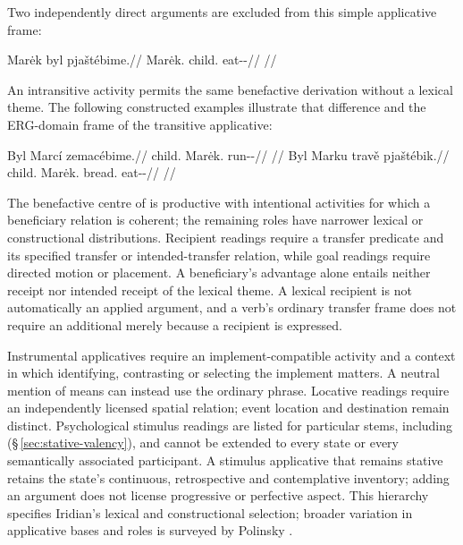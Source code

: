 Two independently direct arguments are excluded from this simple applicative
frame:

\ex
\begingl
\gla *Marėk byl pjaštébime.//
\glb Marėk.\Dir{} child.\Dir{} eat-\Appl{}-\Prog{}//
\glft {}//
\endgl
\xe

An intransitive activity permits the same benefactive derivation without a
lexical theme. The following constructed examples illustrate that difference
and the ERG-domain frame of the transitive applicative:

\pex\label{ex:val-appl-ergative}
\a
\begingl
\gla Byl Marcí zemacébime.//
\glb child.\Dir{} Marėk.\Ind{} run-\Appl{}-\Prog{}//
\glft {}//
\endgl
\a
\begingl
\gla Byl Marku travě pjaštébik.//
\glb child.\Dir{} Marėk.\Trs{} bread.\Ind{} eat-\Appl{}-\Pf{}//
\glft {}//
\endgl
\xe

The benefactive centre of  is productive with intentional
activities for which a beneficiary relation is coherent; the remaining roles
have narrower lexical or constructional distributions. Recipient readings
require a transfer predicate and its specified transfer or intended-transfer
relation, while goal readings require directed motion or placement. A
beneficiary's advantage alone entails neither receipt nor intended receipt of
the lexical theme. A lexical recipient is not automatically an applied
argument, and a verb's ordinary transfer frame does not require an additional
 merely because a recipient is expressed.

Instrumental applicatives require an implement-compatible activity and a
context in which identifying, contrasting or selecting the implement matters.
A neutral mention of means can instead use the ordinary  phrase.
Locative readings require an independently licensed spatial relation; event
location and destination remain distinct. Psychological stimulus readings are
listed for particular stems, including 
(§\,\ref{sec:stative-valency}), and cannot be extended to every state or
every semantically associated participant. A stimulus applicative that
remains stative retains the state's continuous, retrospective and
contemplative inventory; adding an argument does not license progressive
or perfective aspect. This hierarchy specifies Iridian's
lexical and constructional selection; broader variation in applicative bases
and roles is surveyed by Polinsky \cite[§§2, 4]{polinsky2013appl}.

